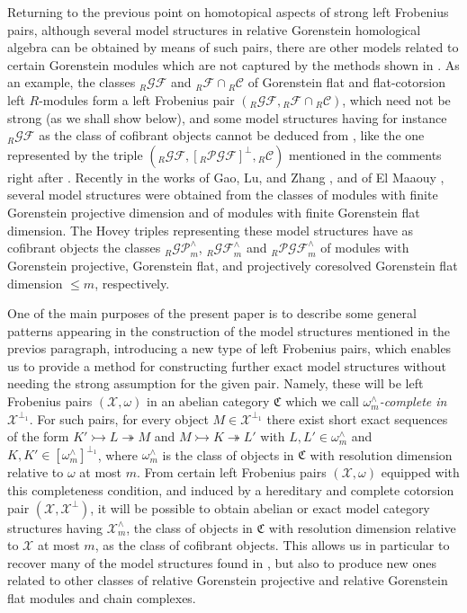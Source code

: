 \documentclass[10pt,reqno]{amsart}
\numberwithin{equation}{section}
\theoremstyle{remark}
\newcommand{\C}{\mathfrak{C}}
\newcommand{\X}{\mathcal{X}}
\begin{document}
Returning to the previous point on homotopical aspects of strong left Frobenius pairs, although several model structures in relative Gorenstein homological algebra can be obtained by means of such pairs, there are other models  related to certain Gorenstein modules which are not captured by the methods shown in \cite[Thm. 4.1]{BMSP}. As an example, the classes ${}_R\mathcal{GF}$ and ${}_R\mathcal{F} \cap {}_R\mathcal{C}$ of Gorenstein flat and flat-cotorsion left $R$-modules form a left Frobenius pair $({}_R\mathcal{GF},{}_R\mathcal{F} \cap {}_R\mathcal{C})$, which need not be strong (as we shall show below), and some model structures having for instance ${}_R\mathcal{GF}$ as the class of cofibrant objects cannot be deduced from \cite[Thm. 4.1]{BMSP}, like the one represented by the triple $({}_R\mathcal{GF},[{}_R\mathcal{PGF}]^\perp,{}_R\mathcal{C})$ mentioned in the comments right after \cite[Coroll. 4.12]{Saroch}. Recently in the works of Gao, Lu, and Zhang \cite{Chains}, and of El Maaouy \cite{Rachid}, several model structures were obtained from the classes of modules with finite Gorenstein projective dimension and of modules with finite Gorenstein flat dimension. The Hovey triples representing these model structures have as cofibrant objects the classes ${}_R\mathcal{GP}^\wedge_m$, ${}_R\mathcal{GF}^\wedge_m$ and ${}_R\mathcal{PGF}^\wedge_m$ of modules with Gorenstein projective, Gorenstein flat, and projectively coresolved Gorenstein flat dimension $\leq m$, respectively. 

One of the main purposes of the present paper is to describe some general patterns appearing in the construction of the model structures mentioned in the previos paragraph, introducing a new type of left Frobenius pairs, which enables us to provide a method for constructing further exact model structures without needing the strong assumption for the given pair. Namely, these will be left Frobenius pairs $(\X,\omega)$ in an abelian category $\C$ which we call \emph{$\omega^\wedge_m$-complete in $\X^{\perp_1}$}. For such pairs, for every object $M \in \X^{\perp_1}$ there exist short exact sequences of the form $K' \rightarrowtail L \twoheadrightarrow M$ and $M \rightarrowtail K \twoheadrightarrow L'$ with $L, L' \in \omega^\wedge_m$ and $K, K' \in [\omega^\wedge_m]^{\perp_1}$, where $\omega^\wedge_m$ is the class of objects in $\C$ with resolution dimension relative to $\omega$ at most $m$. From certain left Frobenius pairs $(\X,\omega)$ equipped with this completeness condition, and induced by a hereditary and complete cotorsion pair $(\X,\X^\perp)$, it will be possible to obtain abelian or exact model category structures having $\X^\wedge_m$, the class of objects in $\C$ with resolution dimension relative to $\X$ at most $m$, as the class of cofibrant objects. This allows us in particular to recover many of the model structures found in \cite{Chains,Rachid}, but also to produce new ones related to other classes of relative Gorenstein projective and relative Gorenstein flat modules and chain complexes. 
\end{document}

